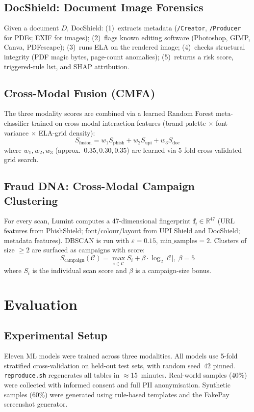 \documentclass[conference]{IEEEtran}
\begin{document}
\subsection{DocShield: Document Image Forensics}
Given a document $D$, DocShield: (1)~extracts metadata
(\texttt{/Creator}, \texttt{/Producer} for PDFs; EXIF for images);
(2)~flags known editing software (Photoshop, GIMP, Canva, PDFescape);
(3)~runs ELA on the rendered image; (4)~checks structural integrity
(PDF magic bytes, page-count anomalies); (5)~returns a risk score,
triggered-rule list, and SHAP attribution.

\subsection{Cross-Modal Fusion (CMFA)}
The three modality scores are combined via a learned Random Forest
meta-classifier trained on cross-modal interaction features
(brand-palette $\times$ font-variance $\times$ ELA-grid density):
\begin{equation}
S_{\text{fusion}} = w_1 S_{\text{phish}} + w_2 S_{\text{upi}} + w_3 S_{\text{doc}}
\end{equation}
where $w_1, w_2, w_3$ (approx.\ $0.35, 0.30, 0.35$) are learned via
5-fold cross-validated grid search.

\subsection{Fraud DNA: Cross-Modal Campaign Clustering}
For every scan, Lumint computes a 47-dimensional fingerprint
$\mathbf{f}_i\!\in\!\mathbb{R}^{47}$ (URL features from PhishShield;
font/colour/layout from UPI Shield and DocShield; metadata features).
DBSCAN is run with $\varepsilon{=}0.15$, $\mathrm{min\_samples}{=}2$.
Clusters of size $\geq 2$ are surfaced as campaigns with score:
\begin{equation}
S_{\text{campaign}}(\mathcal{C}) = \max_{i\in\mathcal{C}} S_i + \beta\cdot\log_2|\mathcal{C}|,\; \beta{=}5
\end{equation}
where $S_i$ is the individual scan score and $\beta$ is a
campaign-size bonus.

\section{Evaluation}

\subsection{Experimental Setup}
Eleven ML models were trained across three modalities. All models use
5-fold stratified cross-validation on held-out test sets, with random
seed~42 pinned. \texttt{reproduce.sh} regenerates all tables in
$\approx$15~minutes. Real-world samples (40\%) were collected with
informed consent and full PII anonymisation. Synthetic samples (60\%)
were generated using rule-based templates and the FakePay screenshot
generator.
\end{document}
